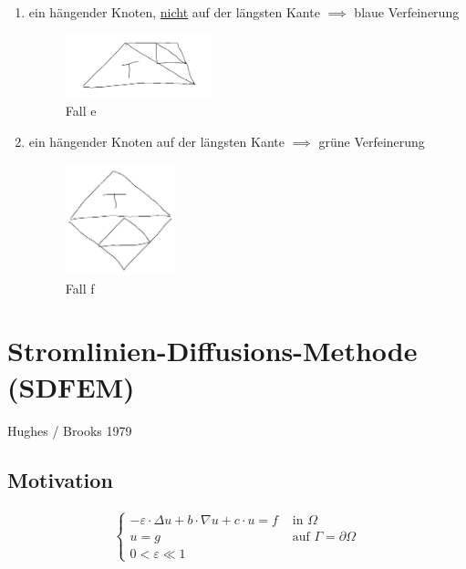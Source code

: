 \begin{enumerate}[label=\alph*)]
\begin{figure}[!ht]
	\end{figure}
	\item ein hängender Knoten, \underline{nicht} auf der längsten Kante $\implies$ blaue Verfeinerung
	\begin{figure}[!ht]
		\begin{center}
			\includegraphics[width=0.4\textwidth]{pics/Sketch14.png}
			\caption{Fall e}
			\label{AbbVerfeinerungE}
		\end{center}
	\end{figure}
	\item ein hängender Knoten auf der längsten Kante $\implies$ grüne Verfeinerung
	\begin{figure}[!ht]
		\begin{center}
			\includegraphics[width=0.3\textwidth]{pics/Sketch15.png}
			\caption{Fall f}
			\label{AbbVerfeinerungF}
		\end{center}
	\end{figure}
\end{enumerate}

\section{Stromlinien-Diffusions-Methode (SDFEM)} %
Hughes / Brooks 1979

\subsection{Motivation}
\begin{align*}
\left\lbrace
	\begin{array}{rl}
	-\varepsilon\cdot\Delta u+b\cdot \nabla u+c\cdot u=f&\text{ in }\Omega\\
	u=g&\text{ auf }\Gamma=\partial\Omega\\
	0<\varepsilon\ll 1&
	\end{array}
	\right.
\end{align*}

